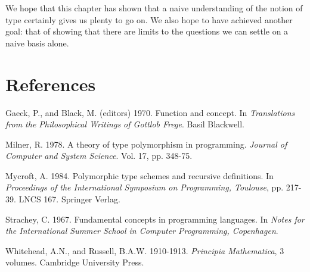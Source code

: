 We hope that this chapter has shown that a naive understanding of the
notion of type certainly gives us plenty to go on. We also hope to have
achieved another goal: that of showing that there are limits to the questions
we can settle on a naive basis alone.

\section*{References}

\begin{references}

\item Gaeck, P., and Black, M. (editors) 1970. Function and concept. In \textit{Translations
from the Philosophical Writings of Gottlob Frege}. Basil Blackwell.

\item Milner, R. 1978. A theory of type polymorphism in programming. \textit{Journal of
Computer and System Science}. Vol. 17, pp. 348-75.

\item Mycroft, A. 1984. Polymorphic type schemes and recursive definitions. In \textit{Proceedings
of the International Symposium on Programming, Toulouse}, pp. 217-39. LNCS
167. Springer Verlag.

\item Strachey, C. 1967. Fundamental concepts in programming languages. In \textit{Notes for the
International Summer School in Computer Programming, Copenhagen}.

\item Whitehead, A.N., and Russell, B.A.W. 1910-1913. \textit{Principia Mathematica}, 3
volumes. Cambridge University Press.

\end{references}